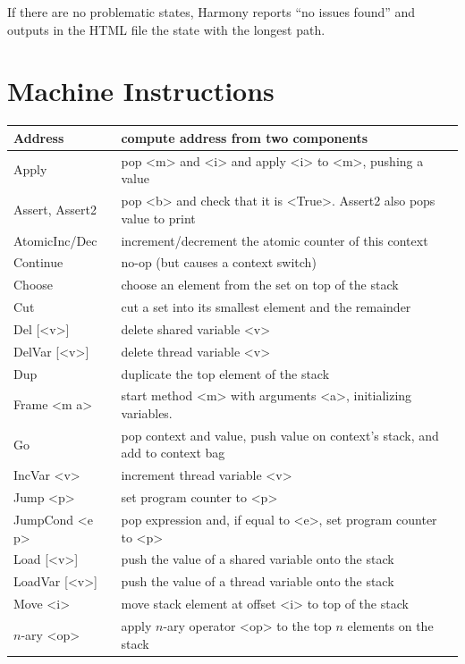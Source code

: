 \documentclass{report}
\begin{document}
If there are no problematic states, Harmony reports ``no issues found'' and outputs
in the HTML file the state with the longest path.

\section{Machine Instructions}
\label{ap:harmonybytecode}

{\small
\begin{tabular}{|l|l|}
\hline
Address & compute address from two components \\
\hline
Apply & pop <{m}> and <{i}> and apply <{i}> to <{m}>, pushing a value \\
\hline
Assert, Assert2 & pop <{b}> and check that it is <{True}>.  Assert2 also pops value to print \\
\hline
AtomicInc/Dec & increment/decrement the atomic counter of this context \\
\hline
Continue & no-op (but causes a context switch) \\
\hline
Choose & choose an element from the set on top of the stack \\
\hline
Cut & cut a set into its smallest element and the remainder \\
\hline
Del [<{v}>] & delete shared variable <{v}> \\
\hline
DelVar [<{v}>] & delete thread variable <{v}> \\
\hline
Dup & duplicate the top element of the stack \\
\hline
Frame <{m a}> & start method <{m}> with arguments <{a}>,
initializing variables.  \\
\hline
Go & pop context and value, push value on context's stack, and add to context bag \\
\hline
IncVar <{v}> & increment thread variable <{v}> \\
\hline
Jump <{p}> & set program counter to <{p}> \\
\hline
JumpCond <{e p}> & pop expression and, if equal to <{e}>, set program counter to <{p}> \\
\hline
Load [<{v}>] & push the value of a shared variable onto the stack \\
\hline
LoadVar [<{v}>] & push the value of a thread variable onto the stack \\
\hline
Move <{i}> & move stack element at offset <{i}> to top of the stack \\
\hline
$n$-ary <{op}> & apply $n$-ary operator <{op}> to the top $n$ elements on the stack \\

\end{tabular}}
\end{document}
